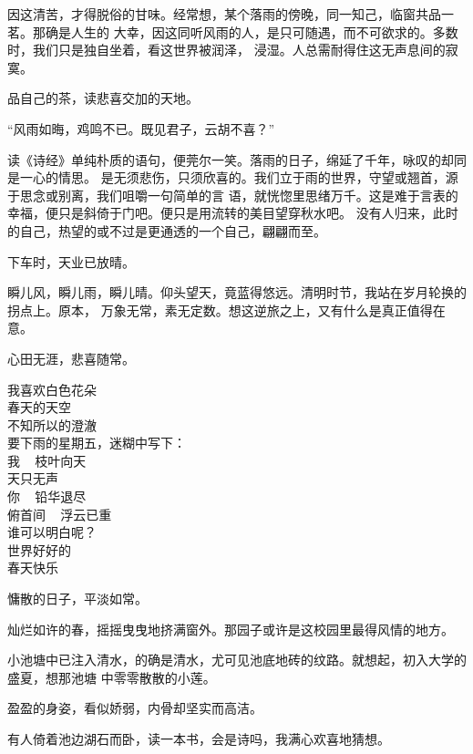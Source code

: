 		因这清苦，才得脱俗的甘味。经常想，某个落雨的傍晚，同一知己，临窗共品一茗。那确是人生的
	大幸，因这同听风雨的人，是只可随遇，而不可欲求的。多数时，我们只是独自坐着，看这世界被润泽，
	浸湿。人总需耐得住这无声息间的寂寞。

		品自己的茶，读悲喜交加的天地。

		“风雨如晦，鸡鸣不已。既见君子，云胡不喜？”

		读《诗经》单纯朴质的语句，便莞尔一笑。落雨的日子，绵延了千年，咏叹的却同是一心的情思。
	是无须悲伤，只须欣喜的。我们立于雨的世界，守望或翘首，源于思念或别离，我们咀嚼一句简单的言
	语，就恍惚里思绪万千。这是难于言表的幸福，便只是斜倚于门吧。便只是用流转的美目望穿秋水吧。
	没有人归来，此时的自己，热望的或不过是更通透的一个自己，翩翩而至。

		下车时，天业已放晴。

		瞬儿风，瞬儿雨，瞬儿晴。仰头望天，竟蓝得悠远。清明时节，我站在岁月轮换的拐点上。原本，
	万象无常，素无定数。想这逆旅之上，又有什么是真正值得在意。

		心田无涯，悲喜随常。

	\endwriting



		\longpoem{}{}{}
			我喜欢白色花朵 \\
			春天的天空 \\
			不知所以的澄澈 \\
			要下雨的星期五，迷糊中写下：\\
			我 ~ 枝叶向天 \\
			天只无声 \\
			你 ~ 铅华退尽 \\
			俯首间 ~ 浮云已重 \\
			谁可以明白呢？ \\
			世界好好的 \\
			春天快乐
		\endlongpoem

	\endwriting


	\label{diary_20050416}

		慵散的日子，平淡如常。

		灿烂如许的春，摇摇曳曳地挤满窗外。那园子或许是这校园里最得风情的地方。

		小池塘中已注入清水，的确是清水，尤可见池底地砖的纹路。就想起，初入大学的盛夏，想那池塘
	中零零散散的小莲。

		盈盈的身姿，看似娇弱，内骨却坚实而高洁。

		有人倚着池边湖石而卧，读一本书，会是诗吗，我满心欢喜地猜想。

